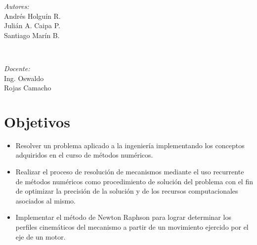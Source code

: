 \documentclass[12pt]{article}
\begin{document}
\begin{titlepage}
		\begin{minipage}{0.4\textwidth}
		\begin{flushleft} \large
			\emph{Autores:}\\
			Andrés Holguín R.\\
			Julián A. Caipa P.\\
			Santiago Marín B.
			
			\medskip
			\medskip
			\medskip
			\end{flushleft}
			\end{minipage}~
			\begin{minipage}{0.4\textwidth}
            
			\begin{flushright} \large
			\emph{Docente:} \\
			Ing. Oswaldo\\
			 Rojas Camacho
		\end{flushright}
        \end{minipage}
        
\newpage

\tableofcontents
\end{titlepage}


\newpage

\section{Objetivos}
\begin{itemize}
    \item Resolver un problema aplicado a la ingeniería implementando los conceptos adquiridos en el curso de métodos numéricos. 
    \item Realizar el proceso de resolución de mecanismos mediante el uso recurrente de métodos numéricos como procedimiento de solución del problema con el fin de optimizar la precisión de la solución y de los recursos computacionales asociados al mismo.
    \item Implementar el método de Newton Raphson para lograr determinar los perfiles cinemáticos del mecanismo a partir de un movimiento ejercido por el eje de un motor.
\end{itemize}
        \vspace{-10pt}
\end{document}
